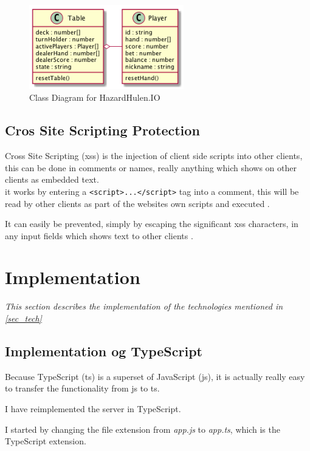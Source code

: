 \documentclass[a4paper]{article}
\begin{document}
\begin{figure}[hbt]
  \centering
  \includegraphics[width=0.6\textwidth]{../UpdatedClassDiag}
  \caption{Class Diagram for HazardHulen.IO}
  \label{img_class_diag}
\end{figure}

\subsection{Cros Site Scripting Protection}
Cross Site Scripting (xss) is the injection of client side scripts into other clients, this can be done in comments or names, really anything which shows on other clients as embedded text.\\
it works by entering a \texttt{<script>...</script>} tag into a comment, this will be read by other clients as part of the websites own scripts and executed \cite{xss}.

It can easily be prevented, simply by escaping the significant xss characters, in any input fields which shows text to other clients \cite{xss-prep}.




\section{Implementation}
\label{sec_imp}
\textit{This section describes the implementation of the technologies mentioned in \autoref{sec_tech}}
\subsection{Implementation og TypeScript}
Because TypeScript (ts) is a superset of JavaScript (js), it is actually really easy to transfer the functionality from js to ts.

I have reimplemented the server in TypeScript.

I started by changing the file extension from \textit{app.js} to \textit{app.ts}, which is the TypeScript extension.
\end{document}
